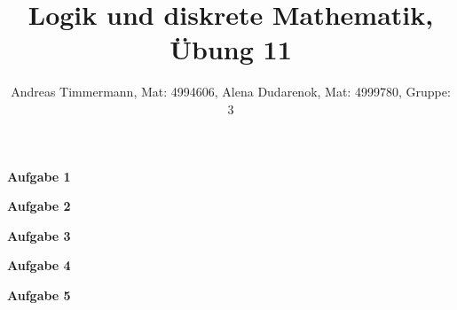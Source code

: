 \documentclass[a4paper]{scrartcl}
\title{Logik und diskrete Mathematik, Übung 11}
\author{Andreas Timmermann, Mat: 4994606, Alena Dudarenok, Mat: 4999780, Gruppe: 3}
\begin{document}
	\maketitle
	\begin{flushleft}
		\textbf{Aufgabe 1}\\
	\end{flushleft}
	\begin{flushleft}
		\textbf{Aufgabe 2}\\
	\end{flushleft}
	\begin{flushleft}
		\textbf{Aufgabe 3}\\
	\end{flushleft}
	\begin{flushleft}
		\textbf{Aufgabe 4}\\
	\end{flushleft}
	\begin{flushleft}
		\textbf{Aufgabe 5}\\
	\end{flushleft}
\end{document}
